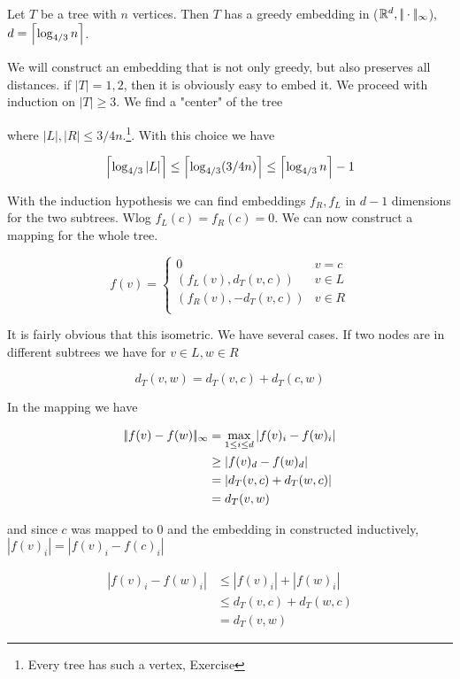 \begin{thm} Let $T$ be a tree with $n$ vertices. Then $T$ has a greedy embedding in ($\mathbb{R}^d,|\!|\cdot|\!|_{\infty}$), $d=\left\lceil \log_{4/3}n \right\rceil$.
\end{thm}

\begin{pr} We will construct an embedding that is not only greedy, but also preserves all distances. if $|T|=1,2$, then it is obviously easy to embed it. We proceed with induction on $|T|\geq 3$. We find a "center" of the tree


where $|L|,|R| \leq 3/4n$.\footnote{Every tree has such a vertex, Exercise}. With this choice we have

\[\left\lceil \log_{4/3}|L| \right\rceil \leq \left\lceil \log_{4/3}(3/4n) \right\rceil \leq \left\lceil \log_{4/3}n \right\rceil-1\]

With the induction hypothesis we can find embeddings $f_R,f_L$ in $d-1$ dimensions for the two subtrees. Wlog $f_L(c) = f_R(c) = 0$. We can now construct a mapping for the whole tree.

\[f(v) = \begin{cases}
0& v=c\\
(f_L(v),d_T(v,c)) & v\in L\\
(f_R(v),-d_T(v,c)) & v\in R\\
\end{cases}\]

It is fairly obvious that this isometric. We have several cases. If two nodes are in different subtrees we have for $v\in L, w\in R$

\[d_T(v,w)=d_T(v,c)+d_T(c,w)\]

In the mapping we have

\begin{align*}
|\!|f(v)-f(w)|\!|_{\infty} &= \max_{1\leq i\leq d} |f(v)_i-f(w)_i|\\
	&\geq |f(v)_d-f(w)_d|\\
	&= |d_T(v,c)+d_T(w,c)|\\
	&=d_T(v,w)
\end{align*}

and since $c$ was mapped to $0$ and the embedding in constructed inductively, $|f(v)_i| = |f(v)_i-f(c)_i|$%

\begin{align*}
|f(v)_i-f(w)_i| & \leq |f(v)_i| + |f(w)_i|\\
	&\leq d_T(v,c)+d_T(w,c)\\
	&=d_T(v,w)
\end{align*}	


\end{pr}
